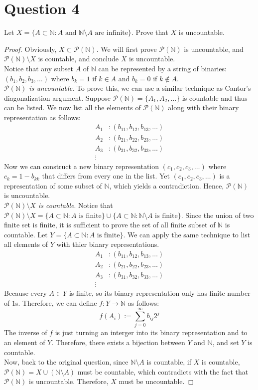 \documentclass{article}
\newcommand{\N}{\mathbb{N}}
\newcommand{\powset}[1]{\mathcal{P}(#1)}
\begin{document}
\section*{Question 4}
Let $X = \{ A \subset \N : A \textrm{ and } \N \setminus A \textrm{ are infinite} \}$.
Prove that $X$ is uncountable.\\


\begin{proof}
Obviously, $X \subset \powset{\N}$.  We will first prove $\powset{\N}$ is
uncountable, and $\powset{\N}\setminus X$ is countable, and conclude
$X$ is uncountable.\\

Notice that any subset $A$ of $\N$ can be represented by a string of binaries:
$(b_1, b_2, b_3, \dots)$ where $b_k = 1$ if $k \in A$ and $b_k = 0$
if $k \notin A$.\\

\emph{$\powset{\N}$ is uncountable}. To prove this,  we can use a similar
technique as Cantor's diagonalization argument.
Suppose $\powset{\N} = \{A_1, A_2, \dots\}$
is countable and thus can be listed. We now list all the elements of
$\powset{\N}$ along with their binary representation as follows:
\begin{align*}
  A_1 &: (b_{11}, b_{12}, b_{13}, \dots) \\
  A_2 &: (b_{21}, b_{22}, b_{23}, \dots) \\
  A_3 &: (b_{31}, b_{32}, b_{33}, \dots) \\
  \vdots
\end{align*}
Now we can construct a new binary representation $(c_1, c_2, c_3, \dots)$ where
$c_k = 1 - b_{kk}$ that differs from every one in the list.
Yet $(c_1, c_2, c_3, \dots)$ is a representation of some subset of $\N$,
which yields a contradiction. Hence, $\powset{\N}$ is uncountable.\\

\emph{$\powset{\N}\setminus X$ is countable}.
Notice that $\powset{\N}\setminus X = \{A \subset \N: A \textrm{ is finite} \}
\cup \{A \subset \N: \N\setminus A \textrm{ is finite} \}$.
Since the union of two finite set is finite, it is sufficient to prove
the set of all finite subset of $\N$ is countable.
Let $Y = \{A \subset \N: A \textrm{ is finite}\}$.
We can apply the same technique to list all elements of $Y$ with thier
binary representations.
\begin{align*}
  A_1 &: (b_{11}, b_{12}, b_{13}, \dots) \\
  A_2 &: (b_{21}, b_{22}, b_{23}, \dots) \\
  A_3 &: (b_{31}, b_{32}, b_{33}, \dots) \\
  \vdots
\end{align*}
Because every $A \in Y$ is finite, so its binary representation only has
finite number of $1$s. Therefore, we can define $f: Y \to \N$ as follows:
$$ f(A_i) := \sum_{j=0}^{\infty} b_{ij} 2^j $$
The inverse of $f$ is just turning an interger into its binary representation
and to an element of $Y$. Therefore, there exists a bijection between $Y$
and $\N$, and set $Y$ is countable. \\

Now, back to the original question, since $\N \setminus A$ is countable,
if $X$ is countable, $\powset{\N} = X \cup (\N \setminus A)$ must be countable,
which contradicts with the fact that $\powset{\N}$ is uncountable.
Therefore, $X$ must be uncountable.
\end{proof}
\end{document}
